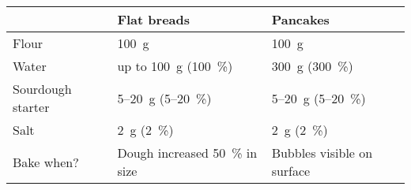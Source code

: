 \begin{tabular}{@{}lll@{}}
\toprule
                  & \textbf{Flat breads}           & \textbf{Pancakes}          \\ \midrule
Flour             & \qty{100}{g}                   & \qty{100}{g}                       \\ 
Water             & up to \qty{100}{g} (\qty{100}{\percent})     & \qty{300}{g} (\qty{300}{\percent})               \\ 
Sourdough starter & 5--\qty{20}{g} (5--\qty{20}{\percent})       & 5--\qty{20}{g} (5--\qty{20}{\percent})           \\ 
Salt              & \qty{2}{g} (\qty{2}{\percent})               & \qty{2}{g} (\qty{2}{\percent})                   \\ 
        Bake when?        & Dough increased \qty{50}{\percent} in size & Bubbles visible on surface \\ \bottomrule
\end{tabular}
